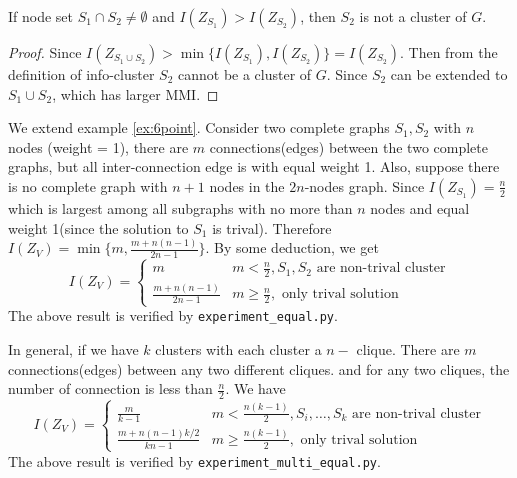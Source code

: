 \documentclass{article}
\begin{document}
\begin{proposition}\label{prop:sub}
If node set $S_1 \cap S_2 \neq \emptyset$ and $I(Z_{S_1}) > I(Z_{S_2})$, then $S_2$ is not a cluster of $G$.
\end{proposition}
\begin{proof}
Since $I(Z_{S_1\cup S_2}) > \min\{I(Z_{S_1}), I(Z_{S_2})\} = I(Z_{S_2})$. Then from the definition of info-cluster $S_2$ cannot be a cluster of $G$.
Since $S_2$ can be extended to $S_1\cup S_2$, which has larger MMI.
\end{proof}
\begin{example}\label{ex:2c}
We extend example \ref{ex:6point}. Consider two complete graphs $S_1, S_2$ with $n$ nodes (weight = 1), there are $m$ connections(edges) between the two complete graphs, but all inter-connection edge is with equal weight 1. Also, suppose there is no complete graph with $n+1$ nodes in the $2n$-nodes graph. Since $I(Z_{S_1})=\frac{n}{2}$ which is largest among all subgraphs with no more than $n$ nodes and equal weight 1(since the solution to $S_1$ is trival). Therefore $I(Z_V) = \min\{m, \frac{m+n(n-1)}{2n-1}\}$. By some deduction, we get
\begin{equation}\label{eq:ee}
I(Z_V) = \begin{cases}
m & m <\frac{n}{2}, S_1,S_2 \textrm{ are non-trival cluster} \\
\frac{m+n(n-1)}{2n-1} & m\geq \frac{n}{2}, \textrm{ only trival solution} 
\end{cases}
\end{equation}
The above result is verified by \texttt{experiment\_equal.py}.

In general, if we have $k$ clusters with each cluster a $n-$ clique. There are $m$ connections(edges) between any two different cliques.  and for any two cliques, the number of connection is less than $\frac{n}{2}$.
We have
\begin{equation}\label{eq:me}
I(Z_V) = \begin{cases}
\frac{m}{k-1} & m <\frac{n(k-1)}{2}, S_i,\dots, S_k \textrm{ are non-trival cluster} \\
\frac{m+n(n-1)k/2}{kn-1} & m\geq \frac{n(k-1)}{2}, \textrm{ only trival solution} 
\end{cases}
\end{equation}
The above result is verified by \texttt{experiment\_multi\_equal.py}.
\end{example}
\end{document}
